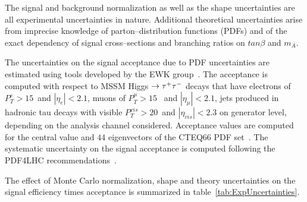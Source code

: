The signal and background normalization as well as the shape uncertainties are
all experimental uncertainties in nature.  Additional theoretical uncertainties
arise from imprecise knowledge of parton--distribution functions (PDFs) and of
the exact dependency of signal cross--sections and branching ratios on
$tan\beta$ and $m_A$.

The uncertainties on the signal acceptance due to PDF uncertainties are
estimated using tools developed by the EWK
group~\cite{CMS_EWK_pdfUncertaintyTools}.  The acceptance is computed with
respect to MSSM Higgs $\to \tau^+\tau^-$ decays that have electrons of $P_{T}^{e} >
15$~\GeV and $\left| \eta_{e} \right| < 2.1$, muons of $P_{T}^{\mu} > 15$~\GeV
and $\left| \eta_{\mu} \right| < 2.1$, jets produced in hadronic tau decays with
visible $P_{T}^{vis} > 20$~\GeV and $\left| \eta_{vis} \right| < 2.3$ on
generator level, depending on the analysis channel considered.  Acceptance
values are computed for the central value and $44$ eigenvectors of the CTEQ66
PDF set~\cite{CTEQpdfSet}.  The systematic uncertainty on the signal acceptance
is computed following the PDF4LHC
recommendations~\cite{pdfAccSys01,pdfAccSys02}.


The effect of Monte Carlo normalization, shape and theory uncertainties on the
signal efficiency times acceptance is summarized in
table~\ref{tab:ExpUncertainties}.

